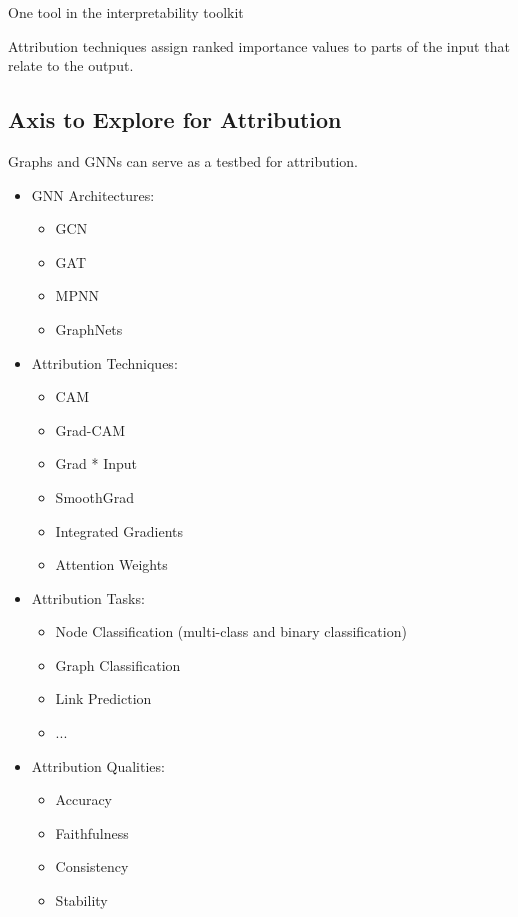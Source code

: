 \begin{motivation}
    One tool in the interpretability toolkit
\end{motivation}

\begin{definition}
    Attribution techniques assign ranked importance values to parts of the input that relate to the output. 
\end{definition}

\subsection{Axis to Explore for Attribution}
\begin{motivation}
    Graphs and GNNs can serve as a testbed for attribution.
\end{motivation}
\begin{notes}
    \begin{itemize}
        \item GNN Architectures: 
        \begin{itemize}
            \item GCN
            \item GAT
            \item MPNN
            \item GraphNets
        \end{itemize}
        \item Attribution Techniques: 
        \begin{itemize}
            \item CAM 
            \item Grad-CAM
            \item Grad * Input
            \item SmoothGrad 
            \item Integrated Gradients
            \item Attention Weights
        \end{itemize}
        \item Attribution Tasks:
        \begin{itemize}
            \item Node Classification (multi-class and binary classification)
            \item Graph Classification
            \item Link Prediction
            \item ...
        \end{itemize}
        \item Attribution Qualities: 
        \begin{itemize}
            \item Accuracy
            \item Faithfulness
            \item Consistency
            \item Stability
        \end{itemize}
    \end{itemize}
\end{notes}

